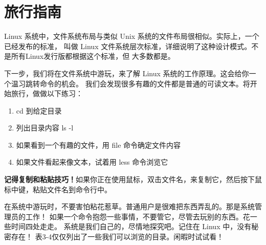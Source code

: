\section{旅行指南} %
\label{sec:旅行指南}

Linux 系统中，文件系统布局与类似 Unix 系统的文件布局很相似。实际上，一个已经发布的标准， 叫做 Linux 文件系统层次标准，详细说明了这种设计模式。不是所有Linux发行版都根据这个标准，但 大多数都是。

\par 下一步，我们将在文件系统中游玩，来了解 Linux 系统的工作原理。这会给你一个温习跳转命令的机会。 我们会发现很多有趣的文件都是普通的可读文本。将开始旅行，做做以下练习：
\begin{enumerate} 
	\item cd 到给定目录
	\item 列出目录内容 ls -l
	\item 如果看到一个有趣的文件，用 file 命令确定文件内容
	\item 如果文件看起来像文本，试着用 less 命令浏览它
\end{enumerate}
\fboxrule=3pt \fboxsep=2pt
\begin{colorboxed}[boxcolor=lightgray,bgcolor=white]
\textbf{记得复制和粘贴技巧！}如果你正在使用鼠标，双击文件名，来复制它，然后按下鼠标中键，粘贴文件名到命令行中。
\end{colorboxed}

\par 在系统中游玩时，不要害怕粘花惹草。普通用户是很难把东西弄乱的。那是系统管理员的工作！ 如果一个命令抱怨一些事情，不要管它，尽管去玩别的东西。花一些时间四处走走。 系统是我们自己的，尽情地探究吧。记住在 Linux 中，没有秘密存在！ 表3-4仅仅列出了一些我们可以浏览的目录。闲暇时试试看！



